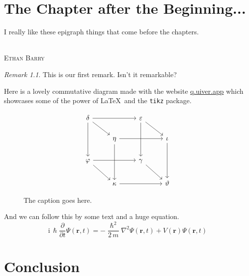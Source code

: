 \documentclass[letterpaper,
               extrafontsizes,
               11pt,
               oneside,
               final]{memoir}   %
\theoremstyle{plain}                        %
\theoremstyle{definition}
\theoremstyle{remark}
\newtheorem{rem}{Remark}
\begin{document}
 \chapter{The Chapter after the Beginning...}
 \epigraph{I really like these epigraph things that come before the chapters.} {\\\textsc{Ethan Barry}}
 \lipsum[11]
 \begin{rem}
  This is our first remark. Isn't it remarkable?
 \end{rem}
 Here is a lovely commutative diagram made with
 the website \href{https://q.uiver.app}{q.uiver.app} which showcases some of the power of \LaTeX\,
 and the \verb|tikz| package.
 \begin{figure}[h!]
   \[
   \begin{tikzcd}
    \delta && \varepsilon \\
    & \eta && \iota \\
    \varphi && \gamma \\
    & \kappa && \vartheta
    \arrow[from=1-1, to=1-3]
    \arrow[from=1-1, to=2-2]
    \arrow[from=1-1, to=3-1]
    \arrow[from=1-3, to=2-4]
    \arrow[from=1-3, to=3-3]
    \arrow[from=2-2, to=2-4]
    \arrow[from=2-2, to=4-2]
    \arrow[from=2-4, to=4-4]
    \arrow[from=3-1, to=3-3]
    \arrow[from=3-1, to=4-2]
    \arrow[from=3-3, to=4-4]
    \arrow[from=4-2, to=4-4]
   \end{tikzcd}
   \]
   \caption{The caption goes here.}
 \end{figure}


 And we can follow this by some text and a huge equation. \lipsum[12]
 \begin{equation*}
    \mathrm{i}\,\hslash\frac{\partial}{\partial t} \Psi(\mathbf{r},t) = -\frac{\hslash^2}{2\,m}\nabla^2\Psi(\mathbf{r},t) + V(\mathbf{r})\Psi(\mathbf{r},t)
\end{equation*}

\chapter*{Conclusion}
\lipsum[13]
\end{document}
